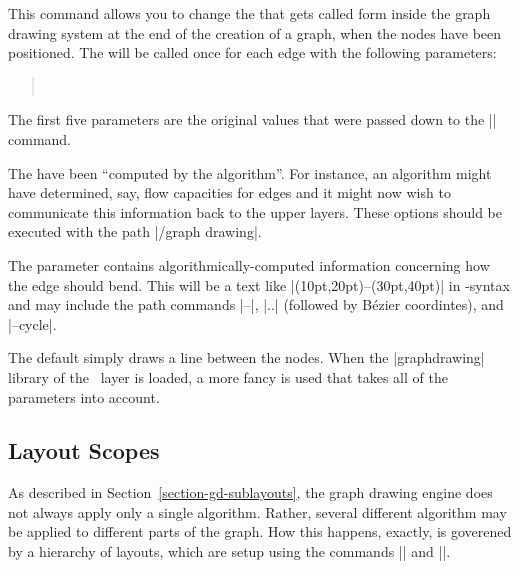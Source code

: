 \begin{command}{\pgfgdsetedgecallback{}}
  This command allows you to change the  that gets called
  form inside the graph drawing system at the end of the creation of a
  graph, when the nodes have been positioned. The  will be 
  called once for each edge with the following parameters:
  \begin{quote}
    \\
  \end{quote}

  The first five parameters are the original values that were passed
  down to the |\pgfgdedge| command.
  
  The  have been ``computed by the
  algorithm''. For instance, an algorithm might have determined, say,
  flow capacities for edges and it might now wish to communicate this
  information back to the upper layers. These options should be
  executed with the path |/graph drawing|.
  
  The parameter  contains
  algorithmically-computed information concerning how the 
  edge should bend. This will be a text like
  |(10pt,20pt)--(30pt,40pt)| in \tikzname-syntax and may include the
  path commands |--|,  |..| (followed by B\'ezier coordintes), and
  |--cycle|. 

  The default  simply draws a line between the nodes. When
  the |graphdrawing| library of the \tikzname\ layer is loaded, a more
  fancy  is used that takes all of the parameters into
  account.
\end{command}



\subsection{Layout Scopes}
\label{section-gd-layout-scopes}

As described in Section~\ref{section-gd-sublayouts}, the graph drawing
engine does not always apply only a single algorithm. Rather, several
different algorithm may be applied to different parts of the
graph. How this happens, exactly, is goverened by a hierarchy of
layouts, which are setup using the commands |\pgfgdbeginlayout| and
|\pgfgdendlayout|.


